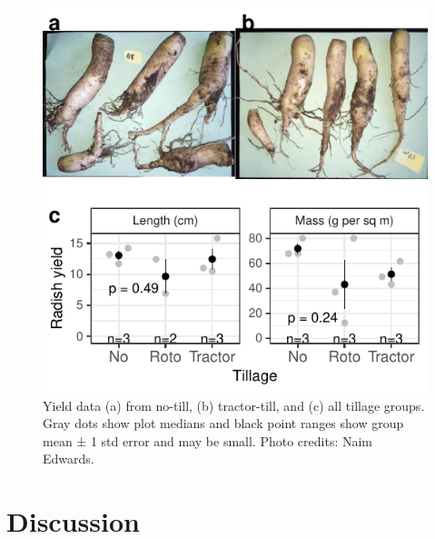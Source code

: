 \documentclass[
  12pt,
]{article}
\begin{document}
\begin{figure}
\centering
\includegraphics{merge_files/figure-latex/yieldFig-1.pdf}
\caption{\label{fig:yieldFig}Yield data (a) from no-till, (b) tractor-till, and (c) all tillage groups. Gray dots show plot medians and black point ranges show group mean ± 1 std error and may be small. Photo credits: Naim Edwards.}
\end{figure}

\hypertarget{discussion}{%
\section{Discussion}\label{discussion}}
\end{document}
